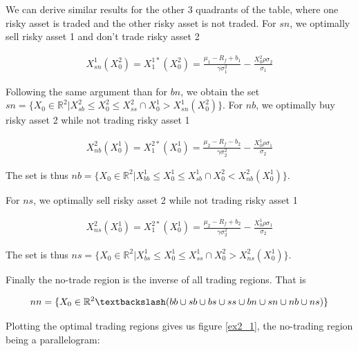 \documentclass[10pt]{article}
\begin{document}
\bigbreak

We can derive similar results for the other 3 quadrants of the table, where one risky asset is traded and the other risky asset is not traded. For $sn$, we optimally sell risky asset 1 and don't trade risky asset 2

\begin{align*}
	X_{sn}^1(X_0^2) =  X_1^{1*}(X_0^2)  = \frac{\mu_1 - R_f + b_1}{\gamma \sigma_1^2} - \frac{X_0^2 \rho  \sigma_2}{\sigma_1}
\end{align*}

Following the same argument than for $bn$, we obtain the set $sn = \{ X_0 \in \mathbb{R}^2 \vert X_{sb}^2 \leq X_0^2 \leq X_{ss}^2 \cap X_0^1 > X_{sn}^1(X_0^2) \}$. For $nb$, we optimally buy risky asset 2 while not trading risky asset 1

\begin{align*}
	X_{nb}^2(X_0^1) =  X_1^{2*}(X_0^1)  = \frac{\mu_2 - R_f - b_2}{\gamma \sigma_2^2} - \frac{X_0^1 \rho  \sigma_1}{\sigma_2}
\end{align*}

The set is thus $nb = \{X_0 \in \mathbb{R}^2 \vert X_{bb}^1 \leq X_0^1 \leq X_{sb}^1 \cap X_0^2 < X_{nb}^2(X_0^1) \}$.

For $ns$, we optimally sell risky asset 2 while not trading risky asset 1

\begin{align*}
	X_{ns}^2(X_0^1) =  X_1^{2*}(X_0^1)  = \frac{\mu_2 - R_f + b_2}{\gamma \sigma_2^2} - \frac{X_0^1 \rho  \sigma_1}{\sigma_2}
\end{align*}

The set is thus $ns = \{ X_0 \in \mathbb{R}^2 \vert X_{bs}^1 \leq X_0^1 \leq X_{ss}^1 \cap X_0^2 > X_{ns}^2(X_0^1) \}$.

\bigbreak

Finally the no-trade region is the inverse of all trading regions. That is 

\begin{align*}
	nn = \{ X_0 \in \mathbb{R}^2 \textbackslash (bb \cup sb \cup bs \cup ss \cup bn \cup sn \cup nb \cup ns) \}
\end{align*}

Plotting the optimal trading regions gives us figure \ref{ex2_1}, the no-trading region being a parallelogram: 
\end{document}
